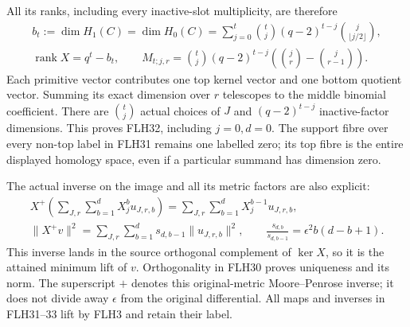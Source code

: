 All its ranks, including every inactive-slot multiplicity,
are therefore
\[
\begin{gathered}
b_t:=\dim H_1(C)=\dim H_0(C)
 =\sum_{j=0}^t\binom tj(q-2)^{t-j}
                         \binom j{\lfloor j/2\rfloor},\\
\operatorname{rank}X=q^t-b_t,\qquad
M_{t;j,r}=\binom tj(q-2)^{t-j}
                         \left(\binom jr-\binom j{r-1}\right).
\end{gathered}\tag{FLH32}
\]
Each primitive vector contributes one top kernel vector and
one bottom quotient vector. Summing its exact dimension
over \(r\) telescopes to the middle binomial coefficient.
There are \(\binom tj\) actual choices of \(J\) and
\((q-2)^{t-j}\) inactive-factor dimensions. This proves FLH32,
including \(j=0,d=0\).
The support fibre over every non-top label in FLH31 remains
one labelled zero; its top fibre is the entire displayed
homology space, even if a particular summand has dimension zero.

The actual inverse on the image and all its metric factors
are also explicit:
\[
\begin{gathered}
X^+\!\left(\sum_{J,r}\sum_{b=1}^{d}X_j^b u_{J,r,b}\right)
 =\sum_{J,r}\sum_{b=1}^{d}X_j^{b-1}u_{J,r,b},\\
\|X^+v\|^2=\sum_{J,r}\sum_{b=1}^{d}
                              s_{d,b-1}\|u_{J,r,b}\|^2,\qquad
\frac{s_{d,b}}{s_{d,b-1}}=\epsilon^2b(d-b+1).
\end{gathered}\tag{FLH33}
\]
This inverse lands in the source orthogonal complement of
\(\ker X\), so it is the attained minimum lift of \(v\).
Orthogonality in FLH30 proves uniqueness and its norm.
The superscript \(+\) denotes this original-metric
Moore--Penrose inverse; it does not divide away \(\epsilon\)
from the original differential.
All maps and inverses in FLH31--33 lift by FLH3 and retain
their label.

